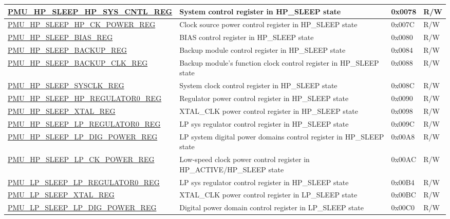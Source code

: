\begin{longtable}{ | l | L{6cm} | l | l | }
\hyperref[regdesc:PMUHPSLEEPHPSYSCNTLREG]{PMU\_HP\_SLEEP\_HP\_SYS\_CNTL\_REG} & System control register in HP\_SLEEP state & 0x0078 & R/W \\ \hline
\hyperref[regdesc:PMUHPSLEEPHPCKPOWERREG]{PMU\_HP\_SLEEP\_HP\_CK\_POWER\_REG} & Clock source power control register in HP\_SLEEP state & 0x007C & R/W \\ \hline
\hyperref[regdesc:PMUHPSLEEPBIASREG]{PMU\_HP\_SLEEP\_BIAS\_REG} & BIAS control register in HP\_SLEEP state & 0x0080 & R/W \\ \hline
\hyperref[regdesc:PMUHPSLEEPBACKUPREG]{PMU\_HP\_SLEEP\_BACKUP\_REG} & Backup module control register in HP\_SLEEP state & 0x0084 & R/W \\ \hline
\hyperref[regdesc:PMUHPSLEEPBACKUPCLKREG]{PMU\_HP\_SLEEP\_BACKUP\_CLK\_REG} & Backup module's function clock control register in HP\_SLEEP state & 0x0088 & R/W \\ \hline
\hyperref[regdesc:PMUHPSLEEPSYSCLKREG]{PMU\_HP\_SLEEP\_SYSCLK\_REG} & System clock control register in HP\_SLEEP state & 0x008C & R/W \\ \hline
\hyperref[regdesc:PMUHPSLEEPHPREGULATOR0REG]{PMU\_HP\_SLEEP\_HP\_REGULATOR0\_REG} & Regulator power control register in HP\_SLEEP state & 0x0090 & R/W \\ \hline
\hyperref[regdesc:PMUHPSLEEPXTALREG]{PMU\_HP\_SLEEP\_XTAL\_REG} & XTAL\_CLK power control register in HP\_SLEEP state & 0x0098 & R/W \\ \hline
\hyperref[regdesc:PMUHPSLEEPLPREGULATOR0REG]{PMU\_HP\_SLEEP\_LP\_REGULATOR0\_REG} & LP sys regulator control register in HP\_SLEEP state & 0x009C & R/W \\ \hline
\hyperref[regdesc:PMUHPSLEEPLPDIGPOWERREG]{PMU\_HP\_SLEEP\_LP\_DIG\_POWER\_REG} & LP system digital power domains control register in HP\_SLEEP state & 0x00A8 & R/W \\ \hline
\hyperref[regdesc:PMUHPSLEEPLPCKPOWERREG]{PMU\_HP\_SLEEP\_LP\_CK\_POWER\_REG} & Low-speed clock power control register in HP\_ACTIVE/HP\_SLEEP state & 0x00AC & R/W \\ \hline
\hyperref[regdesc:PMULPSLEEPLPREGULATOR0REG]{PMU\_LP\_SLEEP\_LP\_REGULATOR0\_REG} & LP sys regulator control register in HP\_SLEEP state  & 0x00B4 & R/W \\ \hline
\hyperref[regdesc:PMULPSLEEPXTALREG]{PMU\_LP\_SLEEP\_XTAL\_REG} & XTAL\_CLK power control register in LP\_SLEEP state & 0x00BC & R/W \\ \hline
\hyperref[regdesc:PMULPSLEEPLPDIGPOWERREG]{PMU\_LP\_SLEEP\_LP\_DIG\_POWER\_REG} & Digital power domain control register in LP\_SLEEP state & 0x00C0 & R/W \\ \hline

\end{longtable}
